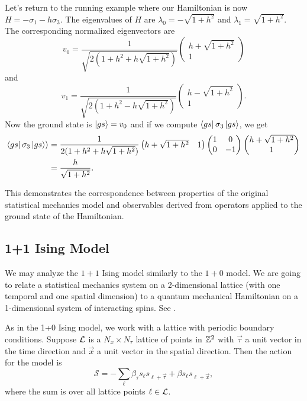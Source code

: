 \documentclass[10pt,reqno]{amsart}
\numberwithin{equation}{section}
\begin{document}
	Let's return to the running example where our Hamiltonian is now $H=-\sigma_1-h\sigma_3$.
	The eigenvalues of $H$ are $\lambda_0=-\sqrt{1+h^2}$ and $\lambda_1=\sqrt{1+h^2}$.
	The corresponding normalized eigenvectors are
		\[v_0= \frac{1}{\sqrt{2(1+h^2+h\sqrt{1+h^2})}}\begin{pmatrix}
		h+\sqrt{1+h^2} \\ 1
		\end{pmatrix} \] 
	and 
		\[ v_1= \frac{1}{\sqrt{2(1+h^2-h\sqrt{1+h^2})}}\begin{pmatrix}
		h-\sqrt{1+h^2} \\ 1
		\end{pmatrix}. \]
	Now the ground state is $\ket{gs}=v_0$ and if we compute $\bra{gs} \sigma_3 \ket{gs}$, we get
		\begin{align*}
			\bra{gs} \sigma_3 \ket{gs} \rangle &=\frac{1}{2(1+h^2+h\sqrt{1+h^2})}\begin{pmatrix}
			h+\sqrt{1+h^2} & 1
			\end{pmatrix}
			\begin{pmatrix}
			1 & 0 \\
			0 & -1
			\end{pmatrix}
			\begin{pmatrix}
			h+\sqrt{1+h^2} \\ 1
			\end{pmatrix}\\
			&=\frac{h}{\sqrt{1+h^2}}.
		\end{align*}
	
	This demonstrates the correspondence between properties of the original statistical mechanics model and observables derived from operators applied to the ground state of the Hamiltonian.
	
	\subsection{1+1 Ising Model}
	
	We may analyze the $1+1$ Ising model similarly to the $1+0$ model. 
	We are going to relate a statistical mechanics system on a 2-dimensional lattice (with one temporal and one spatial dimension) to a quantum mechanical Hamiltonian on a 1-dimensional system of interacting spins.  
	See \cite{FradkinSusskind78,KogutGaugeSummary}.
	
	As in the 1+0 Ising model, we work with a lattice with periodic boundary conditions. 
	Suppose $\mathcal{L}$ is a $N_x \times N_\tau$ lattice of points in $\mathbb{Z}^2$ with $\vec{\tau}$ a unit vector in the time direction and $\vec{x}$ a unit vector in the spatial direction. 
	Then the action for the model is 
	\[ \mathcal{S}= -\sum_{\ell} \beta_\tau s_{\ell}s_{\ell+\vec{\tau}}+\beta s_{\ell}s_{\ell+\vec{x}}, \]
	where the sum is over all lattice points $\ell \in \mathcal{L}$.
	
\end{document}
